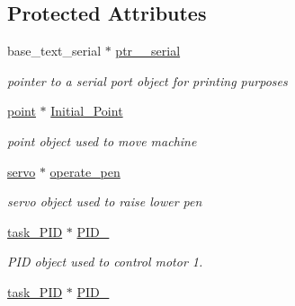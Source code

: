 \subsection*{Protected Attributes}
\begin{DoxyCompactItemize}
\item 
\hypertarget{classtask__lines_acdace444a5715561b80dd929aabb6813}{base\-\_\-text\-\_\-serial $\ast$ \hyperlink{classtask__lines_acdace444a5715561b80dd929aabb6813}{ptr\-\_\-\_\-serial}}\label{classtask__lines_acdace444a5715561b80dd929aabb6813}

\begin{DoxyCompactList}\small\item\em pointer to a serial port object for printing purposes \end{DoxyCompactList}\item 
\hypertarget{classtask__lines_adf126ba6072b70e5525f470bc0d5fd90}{\hyperlink{classpoint}{point} $\ast$ \hyperlink{classtask__lines_adf126ba6072b70e5525f470bc0d5fd90}{Initial\-\_\-\-Point}}\label{classtask__lines_adf126ba6072b70e5525f470bc0d5fd90}

\begin{DoxyCompactList}\small\item\em point object used to move machine \end{DoxyCompactList}\item 
\hypertarget{classtask__lines_ac6c15e2f9c29419c3790196ad18b24dd}{\hyperlink{classservo}{servo} $\ast$ \hyperlink{classtask__lines_ac6c15e2f9c29419c3790196ad18b24dd}{operate\-\_\-pen}}\label{classtask__lines_ac6c15e2f9c29419c3790196ad18b24dd}

\begin{DoxyCompactList}\small\item\em servo object used to raise lower pen \end{DoxyCompactList}\item 
\hypertarget{classtask__lines_af20c4404da342292d6e8e8a7a6004af2}{\hyperlink{classtask__PID}{task\-\_\-\-P\-I\-D} $\ast$ \hyperlink{classtask__lines_af20c4404da342292d6e8e8a7a6004af2}{P\-I\-D\-\_}}\label{classtask__lines_af20c4404da342292d6e8e8a7a6004af2}

\begin{DoxyCompactList}\small\item\em P\-I\-D object used to control motor 1. \end{DoxyCompactList}\item 
\hypertarget{classtask__lines_ac53057e78b84eeb3576ee7ffb2380981}{\hyperlink{classtask__PID}{task\-\_\-\-P\-I\-D} $\ast$ \hyperlink{classtask__lines_ac53057e78b84eeb3576ee7ffb2380981}{P\-I\-D\-\_}}\label{classtask__lines_ac53057e78b84eeb3576ee7ffb2380981}


\end{DoxyCompactItemize}
